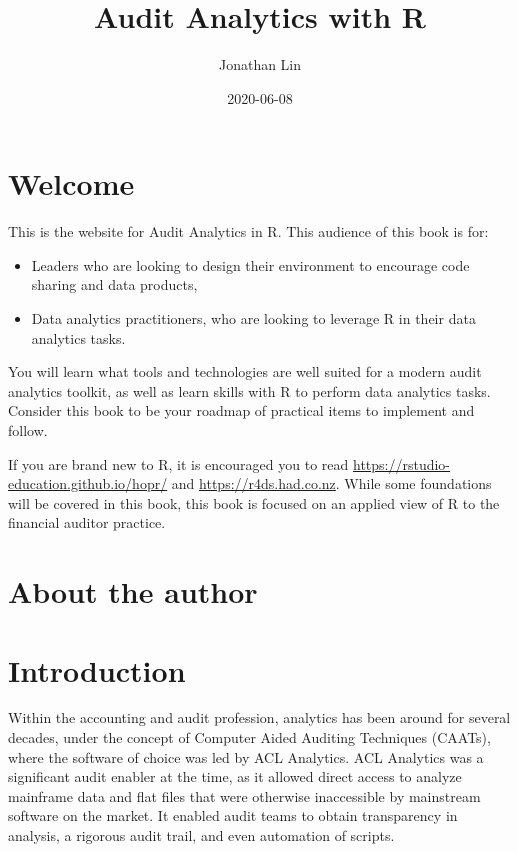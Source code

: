 \documentclass[
]{book}
\title{Audit Analytics with R}
\author{Jonathan Lin}
\date{2020-06-08}
\providecommand{\tightlist}{%
  \setlength{\itemsep}{0pt}\setlength{\parskip}{0pt}}
\begin{document}
\maketitle

{
\setcounter{tocdepth}{1}
\tableofcontents
}
\hypertarget{welcome}{%
\chapter*{Welcome}\label{welcome}}

This is the website for Audit Analytics in R. This audience of this book is for:

\begin{itemize}
\tightlist
\item
  Leaders who are looking to design their environment to encourage code sharing and data products,
\item
  Data analytics practitioners, who are looking to leverage R in their data analytics tasks.
\end{itemize}

You will learn what tools and technologies are well suited for a modern audit analytics toolkit, as well as learn skills with R to perform data analytics tasks. Consider this book to be your roadmap of practical items to implement and follow.

If you are brand new to R, it is encouraged you to read \url{https://rstudio-education.github.io/hopr/} and \url{https://r4ds.had.co.nz}. While some foundations will be covered in this book, this book is focused on an applied view of R to the financial auditor practice.

\hypertarget{about-the-author}{%
\chapter*{About the author}\label{about-the-author}}

\hypertarget{intro}{%
\chapter{Introduction}\label{intro}}

Within the accounting and audit profession, analytics has been around for several decades, under the concept of Computer Aided Auditing Techniques (CAATs), where the software of choice was led by ACL Analytics. ACL Analytics was a significant audit enabler at the time, as it allowed direct access to analyze mainframe data and flat files that were otherwise inaccessible by mainstream software on the market. It enabled audit teams to obtain transparency in analysis, a rigorous audit trail, and even automation of scripts.
\end{document}
